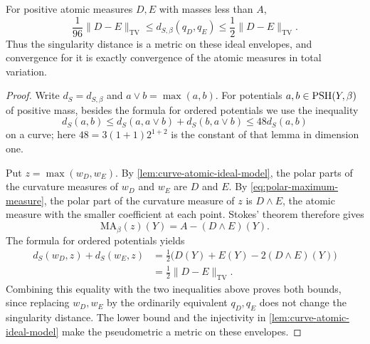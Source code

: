 \begin{theorem}\label{thm:curve-atomic-source-metric}
For positive atomic measures $D,E$ with masses less than $A$,
\[
 \frac1{96}\|D-E\|_{\mathrm{TV}}
 \leq d_{S,\beta}(q_D,q_E)
 \leq\frac12\|D-E\|_{\mathrm{TV}}.
\]
Thus the singularity distance is a metric on these ideal envelopes, and convergence for it is exactly convergence of the atomic measures in total variation.
\end{theorem}
\begin{proof}
Write $d_S=d_{S,\beta}$ and $a\lor b=\max(a,b)$. For potentials $a,b\in\mathrm{PSH}(Y,\beta)$ of positive mass, besides the formula for ordered potentials we use the inequality \cite[Lemma~6.2.1]{SGPT}
\[
 d_S(a,b)\leq d_S(a,a\lor b)+d_S(b,a\lor b)
             \leq48d_S(a,b)
\]
on a curve; here $48=3(1+1)2^{1+2}$ is the constant of that lemma in dimension one.

Put $z=\max(w_D,w_E)$. By \cref{lem:curve-atomic-ideal-model}, the polar parts of the curvature measures of $w_D$ and $w_E$ are $D$ and $E$. By \eqref{eq:polar-maximum-measure}, the polar part of the curvature measure of $z$ is $D\wedge E$, the atomic measure with the smaller coefficient at each point. Stokes' theorem therefore gives
\[
 \mathrm{MA}_\beta(z)(Y)=A-(D\wedge E)(Y).
\]
The formula for ordered potentials yields
\[
 \begin{aligned}
 d_S(w_D,z)+d_S(w_E,z)
 &=\frac12\bigl(D(Y)+E(Y)-2(D\wedge E)(Y)\bigr)\\
 &=\frac12\|D-E\|_{\mathrm{TV}}.
 \end{aligned}
\]
Combining this equality with the two inequalities above proves both bounds, since replacing $w_D,w_E$ by the ordinarily equivalent $q_D,q_E$ does not change the singularity distance. The lower bound and the injectivity in \cref{lem:curve-atomic-ideal-model} make the pseudometric a metric on these envelopes.
\end{proof}

